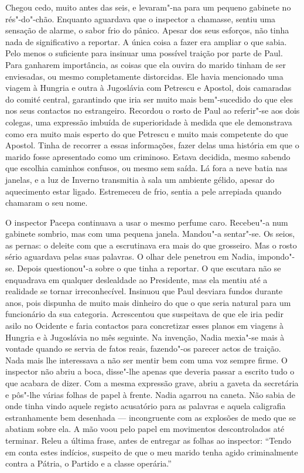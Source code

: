 Chegou cedo, muito antes das seis, e levaram"-na para um pequeno gabinete
no rés"-do"-chão. Enquanto aguardava que o inspector a chamasse, sentiu
uma sensação de alarme, o sabor frio do pânico. Apesar dos seus
esforços, não tinha nada de significativo a reportar. A única coisa a
fazer era ampliar o que sabia. Pelo menos o suficiente para insinuar uma
possível traição por parte de Paul. Para ganharem importância, as coisas
que ela ouvira do marido tinham de ser enviesadas, ou mesmo
completamente distorcidas. Ele havia mencionado uma viagem à Hungria e
outra à Jugoslávia com Petrescu e Apostol, dois camaradas do comité
central, garantindo que iria ser muito mais
bem"-sucedido do que eles nos seus contactos no estrangeiro. Recordou o
rosto de Paul ao referir"-se aos dois colegas, uma expressão imbuída de
superioridade à medida que ele demonstrava como era muito mais esperto
do que Petrescu e muito mais competente do que Apostol. Tinha de
recorrer a essas informações, fazer delas uma história em que o marido
fosse apresentado como um criminoso. Estava decidida, mesmo sabendo que
escolhia caminhos confusos, ou mesmo sem saída. Lá fora a neve batia nas
janelas, e a luz de Inverno transmitia à sala um ambiente gélido, apesar
do aquecimento estar ligado. Estremeceu de frio, sentia a pele arrepiada
quando chamaram o seu nome.

O inspector Pacepa continuava a usar o mesmo perfume caro. Recebeu"-a num gabinete sombrio, mas com uma pequena janela.
Mandou"-a sentar"-se. Os seios, as pernas: o deleite com que a escrutinava
era mais do que grosseiro. Mas o rosto sério aguardava pelas suas
palavras. O olhar dele penetrou em Nadia, impondo"-se. Depois
questionou"-a sobre o que tinha a reportar. O que escutara não se
enquadrava em qualquer deslealdade ao Presidente, mas ela mentiu até a
realidade se tornar irreconhecível. Insinuou que Paul desviara fundos
durante anos, pois dispunha de muito mais dinheiro do que o que seria
natural para um funcionário da sua categoria. Acrescentou que
suspeitava de que ele iria pedir asilo no Ocidente e faria contactos
para concretizar esses planos em viagens à Hungria e à Jugoslávia no
mês seguinte. Na invenção, Nadia mexia"-se mais à vontade quando se
servia de fatos reais, fazendo"-os parecer actos de traição. Nada mais
lhe interessava a não ser mentir bem com uma voz sempre firme. O inspector não
abriu a boca, disse"-lhe apenas que deveria passar a escrito tudo o que
acabara de dizer. Com a mesma expressão grave, abriu a gaveta da
secretária e pôs"-lhe várias folhas de papel à frente. Nadia agarrou na
caneta. Não sabia de onde tinha vindo aquele registo acusatório para as
palavras e aquela caligrafia estranhamente bem desenhada ---
incongruente com as explosões de medo que se abatiam sobre ela. A mão
voou pelo papel em movimentos descontrolados até terminar. Releu a
última frase, antes de entregar as folhas ao inspector:
``Tendo em conta estes indícios, suspeito de que o meu marido tenha agido
criminalmente contra a Pátria, o Partido e a classe operária.''

